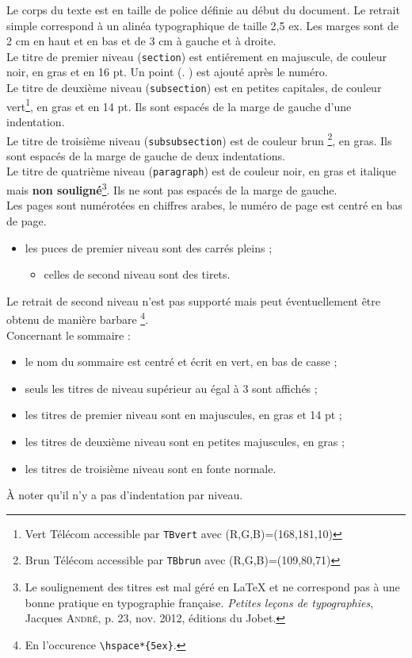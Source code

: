 Le corps du texte est en taille de police définie au début du document. Le retrait simple correspond à un alinéa typographique de taille 2,5 ex. Les marges sont de 2 cm en haut et en bas et de 3 cm à gauche et à droite.\\ 
Le titre de premier niveau (\texttt{section}) est entiérement en majuscule, de couleur noir, en gras et en 16 pt. Un point (\og . \fg) est ajouté après le numéro.\\
Le titre de deuxième niveau (\texttt{subsection}) est en petites capitales, de couleur vert\footnote{Vert \og Télécom \og accessible par \texttt{TBvert} avec (R,G,B)=(168,181,10)}, en gras et en 14 pt. Ils sont espacés de la marge de gauche d'une indentation.\\
Le titre de troisième niveau (\texttt{subsubsection}) est de couleur brun \footnote{Brun \og Télécom \og accessible par \texttt{TBbrun} avec (R,G,B)=(109,80,71)}, en gras. Ils sont espacés de la marge de gauche de deux indentations.\\
Le titre de quatrième niveau (\texttt{paragraph}) est de couleur noir, en gras et italique mais \textbf{non souligné}\footnote{Le soulignement des titres est mal géré en \LaTeX{} et ne correspond pas à une bonne pratique en typographie française. \emph{Petites leçons de typographies}, Jacques \textsc{André}, p. 23, nov. 2012, éditions du Jobet.}. Ils ne sont pas espacés de la marge de gauche.\\
Les pages sont numérotées en chiffres arabes, le numéro de page est centré en bas de page.\\

\begin{itemize}
	\item les puces de premier niveau sont des carrés pleins ;
		\begin{itemize}
			\item celles de second niveau sont des tirets.
		\end{itemize}
\end{itemize}\bigskip

Le retrait de second niveau n'est pas supporté mais peut éventuellement être obtenu de manière \og barbare \fg\footnote{En l'occurence \texttt{\textbackslash hspace*\{5ex\}}.}.\\

\noindent Concernant le sommaire : 
\begin{itemize}
	\item le nom du sommaire est centré et écrit en vert, en bas de casse ;
	\item seuls les titres de niveau supérieur au égal à 3 sont affichés ;
	\item les titres de premier niveau sont en majuscules, en gras et 14 pt ;
	\item les titres de deuxième niveau sont en petites majuscules, en gras ;
	\item les titres de troisième niveau sont en fonte normale.
\end{itemize}
À noter qu'il n'y a pas d'indentation par niveau.\\

